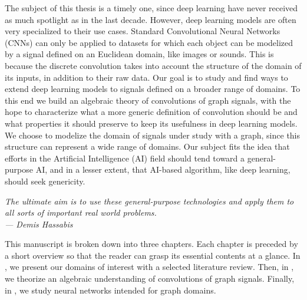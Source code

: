 The subject of this thesis is a timely one, since deep learning have never received as much spotlight as in the last decade. However, deep learning models are often very specialized to their use cases. Standard Convolutional Neural Networks (CNNs) can only be applied to datasets for which each object can be modelized by a signal defined on an Euclidean domain, like images or sounds. This is because the discrete convolution takes into account the structure of the domain of its inputs, in addition to their raw data. Our goal is to study and find ways to extend deep learning models to signals defined on a broader range of domains. To this end we build an algebraic theory of convolutions of graph signals, with the hope to characterize what a more generic definition of convolution should be and what properties it should preserve to keep its usefulness in deep learning models. We choose to modelize the domain of signals under study with a graph, since this structure can represent a wide range of domains. Our subject fits the idea that efforts in the Artificial Intelligence (AI) field should tend toward a general-purpose AI, and in a lesser extent, that AI-based algorithm, like deep learning, should seek genericity.

\begin{displayquote}
\begin{flushright}
\emph{The ultimate aim is to use these general-purpose technologies and apply them to all sorts of important real world problems.\\
--- Demis Hassabis}
\end{flushright}
\end{displayquote}

This manuscript is broken down into three chapters. Each chapter is preceded by a short overview so that the reader can grasp its essential contents at a glance. In , we present our domains of interest with a selected literature review. Then, in , we theorize an algebraic understanding of convolutions of graph signals. Finally, in , we study neural networks intended for graph domains.


